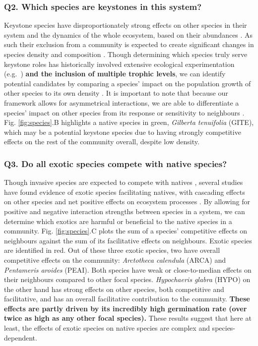 \documentclass[a4,12pt]{article}
\begin{document}
\begin{refsection}
    \subsubsection*{Q2. Which species are keystones in this system?}
    Keystone species have disproportionately strong effects on other species in their system and the dynamics of the whole ecosystem, based on their abundances \parencite{Power1996, Piraino2002, Libralato2006}. As such their exclusion from a community is expected to create significant changes in species density and composition \parencite{Paine1969}. Though determining which species truly serve keystone roles has historically involved extensive ecological experimentation (e.g.\ \cite{Paine1992}) \textbf{and the inclusion of multiple trophic levels}, we can identify potential candidates by comparing a species' impact on the population growth of other species to its own density \parencite{Libralato2006}. It is important to note that because our framework allows for asymmetrical interactions, we are able to differentiate a species' impact on other species from its response or sensitivity to neighbours \parencite{Broekman2020}. Fig. \ref{fig:species}.B highlights a native species in green, \textit{Gilberta tenuifolia} (GITE), which may be a potential keystone species due to having strongly competitive effects on the rest of the community overall, despite low density. 

    \subsubsection*{Q3. Do all exotic species compete with native species?}
    Though invasive species are expected to compete with natives \parencite{Naeem2000, Corbin2004, Riley2008, Zheng2015}, several studies have found evidence of exotic species facilitating natives, with cascading effects on other species and net positive effects on ecosystem processes \parencite{Rodriguez2006, Ramus2017, Wainwright2019}. By allowing for positive and negative interaction strengths between species in a system, we can determine which exotics are harmful or beneficial to the native species in a community. Fig. \ref{fig:species}.C plots the sum of a species' competitive effects on neighbours against the sum of its facilitative effects on neighbours. Exotic species are identified in red. Out of these three exotic species, two have overall competitive effects on the community: \textit{Arctotheca calendula} (ARCA) and \textit{Pentameris aroides} (PEAI). Both species have weak or close-to-median effects on their neighbours compared to other focal species. \textit{Hypochaeris glabra} (HYPO) on the other hand has strong effects on other species, both competitive and facilitative, and has an overall facilitative contribution to the community. \textbf{These effects are partly driven by its incredibly high germination rate (over twice as high as any other focal species).}  These results suggest that here at least, the effects of exotic species on native species are complex and species-dependent.



\end{refsection}
\end{document}
